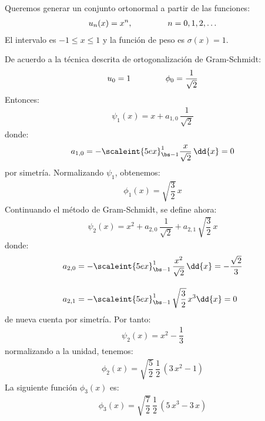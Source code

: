Queremos generar un conjunto ortonormal a partir de las funciones: 
\begin{align*}
u_{n}(x) = x^{n}, \hspace{1.5cm} n = 0, 1, 2, \ldots
\end{align*}
El intervalo es $-1 \leq x \leq 1$ y la función de peso es $\sigma (x) = 1$.
\par
De acuerdo a la técnica descrita de ortogonalización de Gram-Schmidt:
\begin{align}
u_{0} = 1 \hspace{1.5cm} \phi_{0} =  \dfrac{1}{\sqrt{2}}
\label{eq:ecuacion_10_50}
\end{align}
Entonces:
\begin{align}
\psi_{1}(x) = x + a_{1,0} \, \dfrac{1}{\sqrt{2}}
\label{eq:ecuacion_10_51}
\end{align}
donde:
\begin{align}
a_{1, 0} = - \scaleint{5ex}_{\bs -1}^{1} \dfrac{x}{\sqrt{2}} \, \dd{x} = 0
\label{eq:ecuacion_10_52}
\end{align}
por simetría. Normalizando $\psi_{1}$, obtenemos:
\begin{align}
\phi_{1}(x) = \sqrt{\dfrac{3}{2}} \, x
\label{eq:ecuacion_10_53}
\end{align}
Continuando el método de Gram-Schmidt, se define ahora:
\begin{align}
\psi_{2} (x) = x^{2} +  a_{2, 0} \, \dfrac{1}{\sqrt{2}} +  a_{2, 1} \, \sqrt{\dfrac{3}{2}} \, x
\label{eq:ecuacion_10_54}
\end{align}
donde:
\begin{align}
a_{2, 0} &= - \scaleint{5ex}_{\bs -1}^{1} \, \dfrac{x^{2}}{\sqrt{2}} \, \dd{x} = - \dfrac{\sqrt{2}}{3} \label{eq:ecuacion_10_55} \\[1em] 
a_{2, 1} &= - \scaleint{5ex}_{\bs -1}^{1} \, \sqrt{\dfrac{3}{2}} \, x^{3} \dd{x} = 0 \label{eq:ecuacion_10_56}
\end{align}
de nueva cuenta por simetría. Por tanto:
\begin{align}
\psi_{2}(x) = x^{2} - \dfrac{1}{3}
\label{eq:ecuacion_10_57}
\end{align}
normalizando a la unidad, tenemos:
\begin{align}
\phi_{2} (x) = \sqrt{\dfrac{5}{2}} \, \dfrac{1}{2} \, (3 \, x^{2} - 1)
\label{eq:ecuacion_10_58}
\end{align}
La siguiente función $\phi_{3}(x)$ es:
\begin{align}
\phi_{3} (x) = \sqrt{\dfrac{7}{2}} \, \dfrac{1}{2} \, (5 \, x^{3} - 3 \, x)
\label{eq:ecuacion_10_59}
\end{align}

